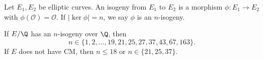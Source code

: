 \begin{frame}[plain]
\end{frame}


\begin{frame}[plain]
	\begin{dfn}[Isogeny]
	Let $E_1,E_2$ be elliptic curves. An isogeny from $E_1$ to $E_2$ is a morphism $\phi: E_1 \to E_2$ with $\phi(\mathcal{O})=\mathcal{O}$. If $|\ker \phi|=n$, we say $\phi$ is an $n$-isogeny. 
	\end{dfn} \pause

	\begin{thm}
	If $E/\Q$ has an $n$-isogeny over $\Q$, then 
		\[
		n \in \{1,2,\ldots,19,21,25,27,37,43,67,163\}. 
		\]
	If $E$ does not have CM, then $n \leq 18$ or $n \in \{21,25,37\}$. 
	\end{thm}
\end{frame}


